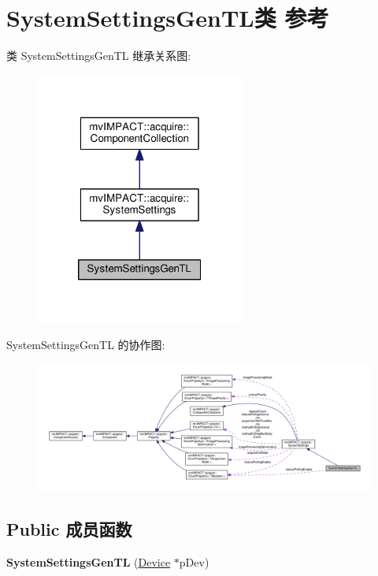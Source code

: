 \hypertarget{class_system_settings_gen_t_l}{\section{System\+Settings\+Gen\+T\+L类 参考}
\label{class_system_settings_gen_t_l}
}


类 System\+Settings\+Gen\+T\+L 继承关系图\+:
\nopagebreak
\begin{figure}[H]
\begin{center}
\leavevmode
\includegraphics[width=194pt]{class_system_settings_gen_t_l__inherit__graph}
\end{center}
\end{figure}


System\+Settings\+Gen\+T\+L 的协作图\+:
\nopagebreak
\begin{figure}[H]
\begin{center}
\leavevmode
\includegraphics[width=350pt]{class_system_settings_gen_t_l__coll__graph}
\end{center}
\end{figure}
\subsection*{Public 成员函数}
\begin{DoxyCompactItemize}
\item 
\hypertarget{class_system_settings_gen_t_l_a16410feace655bfcde662edb6d180517}{{\bfseries System\+Settings\+Gen\+T\+L} (\hyperlink{classmv_i_m_p_a_c_t_1_1acquire_1_1_device}{Device} $\ast$p\+Dev)}\label{class_system_settings_gen_t_l_a16410feace655bfcde662edb6d180517}

\end{DoxyCompactItemize}
